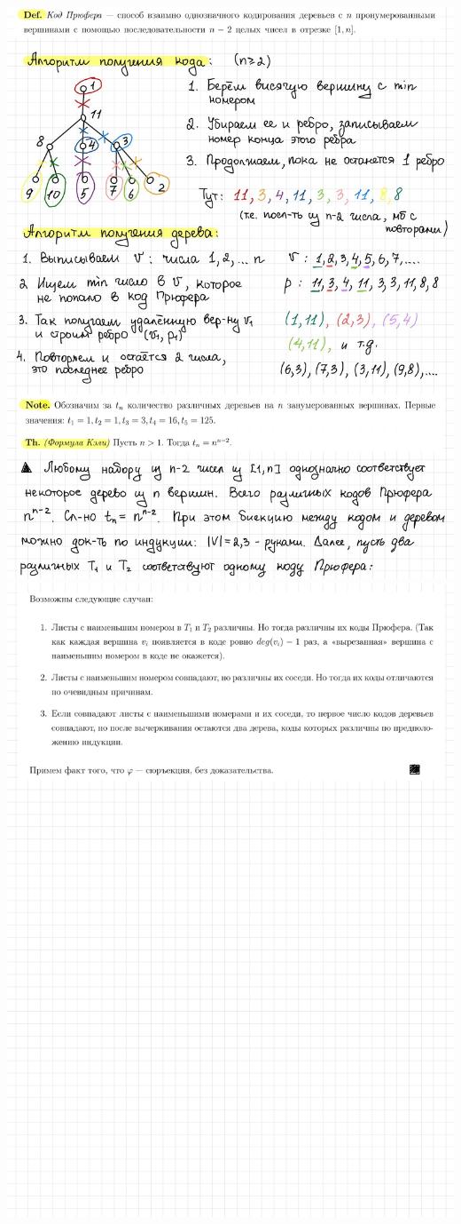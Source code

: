 \includegraphics[width=1\linewidth]{sections/Polina/imgs/13.jpg}
\newpage \includegraphics[width=1\linewidth]{sections/Polina/imgs/14.jpg}